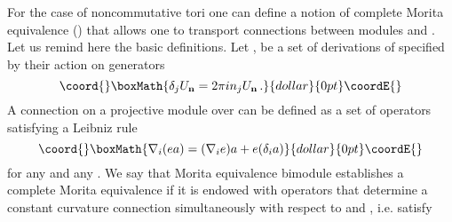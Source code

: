 \documentclass[a4paper,a4paper]{article}
\begin{document}
{For the case of noncommutative tori one can define a notion of complete Morita equivalence (\cite{ASMorita})
that allows one to transport connections between modules \coordHE{} and \coordHE{}. 
Let us remind here the basic  definitions. Let \coordHE{}, \coordHE{} be a set of derivations of  \coordHE{} 
specified by their action on generators  
$$\coord{}\boxMath{
\delta_{j}U_{\bf n} = 2\pi i n_{j}U_{\bf n} \, .
}{dollar}{0pt}\coordE{}$$ 
A connection on a projective module \coordHE{} over \coordHE{} can be defined as a set of operators 
\coordHE{} satisfying a Leibniz rule 
$$\coord{}\boxMath{
\nabla_{i}(ea) = (\nabla_{i}e)a + e(\delta_{i}a)
}{dollar}{0pt}\coordE{}$$
for any \coordHE{} and any \coordHE{}. 
We say that \coordHE{} Morita equivalence bimodule \coordHE{} establishes a complete Morita equivalence if it
is endowed with operators \coordHE{} that determine a constant curvature connection 
simultaneously with respect to \coordHE{} and \coordHE{}, i.e. satisfy  

}
\end{document}
